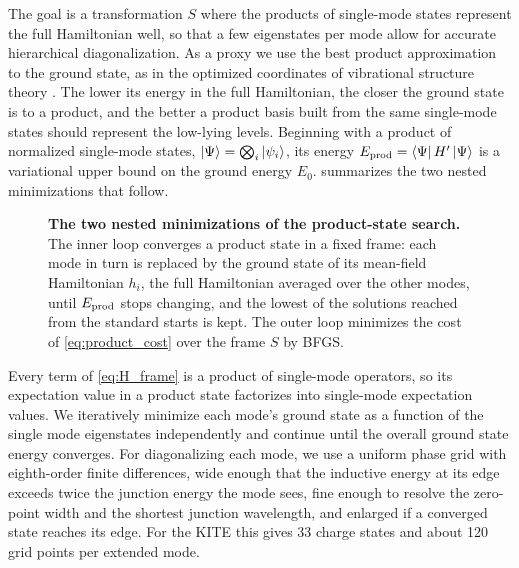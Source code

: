 The goal is a transformation $S$ where the products of single-mode states represent the full Hamiltonian well, so that a few eigenstates per mode allow for accurate hierarchical diagonalization.
As a proxy we use the best product approximation to the ground state, as in the optimized coordinates of vibrational structure theory \cite{yagi2012optimized}.
The lower its energy in the full Hamiltonian, the closer the ground state is to a product, and the better a product basis built from the same single-mode states should represent the low-lying levels.
Beginning with a product of normalized single-mode states, $\ket\Psi=\bigotimes_i\ket{\psi_i}$, its energy $E_{\rm prod}=\bra\Psi H'\ket\Psi$ is a variational upper bound on the ground energy $E_0$.
 summarizes the two nested minimizations that follow.

\begin{figure}[t]
    \centering
    
    \caption{{\bf The two nested minimizations of the product-state search.}
    The inner loop converges a product state in a fixed frame: each mode in turn is replaced by the ground state of its mean-field Hamiltonian $h_i$, the full Hamiltonian averaged over the other modes, until $E_{\rm prod}$ stops changing, and the lowest of the solutions reached from the standard starts is kept.
    The outer loop minimizes the cost of \cref{eq:product_cost} over the frame $S$ by BFGS.}
    \label{fig:meanfield_loops}
\end{figure}

Every term of \cref{eq:H_frame} is a product of single-mode operators, so its expectation value in a product state factorizes into single-mode expectation values.
We iteratively minimize each mode's ground state as a function of the single mode eigenstates independently and continue until the overall ground state energy converges.
For diagonalizing each mode, we use a uniform phase grid with eighth-order finite differences, wide enough that the inductive energy at its edge exceeds twice the junction energy the mode sees, fine enough to resolve the zero-point width and the shortest junction wavelength, and enlarged if a converged state reaches its edge.
For the KITE this gives 33 charge states and about 120 grid points per extended mode.

